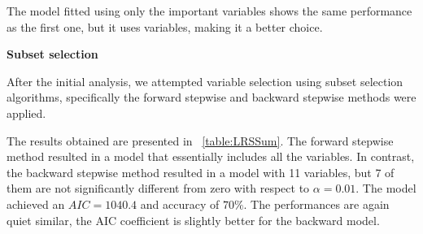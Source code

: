 The model fitted using only the important variables shows the same performance as the first one, but it uses variables, making it a better choice.

\vspace{0.2cm}
\textbf{Subset selection}

After the initial analysis, we attempted variable selection using subset selection algorithms, specifically the forward stepwise and backward stepwise methods were applied. 

The results obtained are presented in \Tab~\ref{table:LRSSum}. The forward stepwise method resulted in a model that essentially includes all the variables. In contrast, the backward stepwise method resulted in a model with 11 variables, but 7 of them are not significantly different from zero with respect to $\alpha = 0.01$. The model achieved an $AIC = 1040.4$ and accuracy of $70\%$. The performances are again quiet similar, the AIC coefficient is slightly better for the backward model.

